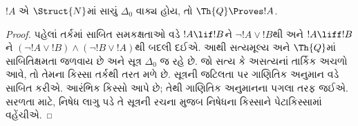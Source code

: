 \begin{lem}
$!A$ એ $\Struct{N}$માં સાચું
$\Delta_0$ વાક્ય હોય,
તો $\Th{Q} \Proves !A$.
\end{lem}

\begin{proof}
પહેલાં તર્કમાં સાબિત સમકક્ષતાઓ વડે
$!A\lif!B$ને $\lnot!A\lor!B$થી અને
$!A\liff!B$ને $(\lnot!A\lor!B)\land(\lnot!B\lor!A)$થી
બદલી દઈએ. આથી સત્યમૂલ્ય અને $\Th{Q}$માં સાબિતિક્ષમતા
જળવાય છે અને સૂત્ર $\Delta_0$ જ રહે છે.
જો સત્ય કે અસત્યનાં તાર્કિક અચળો આવે, તો તેમના કિસ્સા
તર્કથી તરત મળે છે.
સૂત્રની જટિલતા પર
ગાણિતિક અનુમાન વડે સાબિત કરીએ.
આરંભિક કિસ્સો
આપે છે; તેથી ગાણિતિક અનુમાનના
પગલા તરફ જઈએ. સરળતા માટે,
નિષેધ લાગુ પડે તે
સૂત્રની રચના મુજબ
નિષેધના કિસ્સાને પેટાકિસ્સામાં
વહેંચીએ.


\end{proof}
